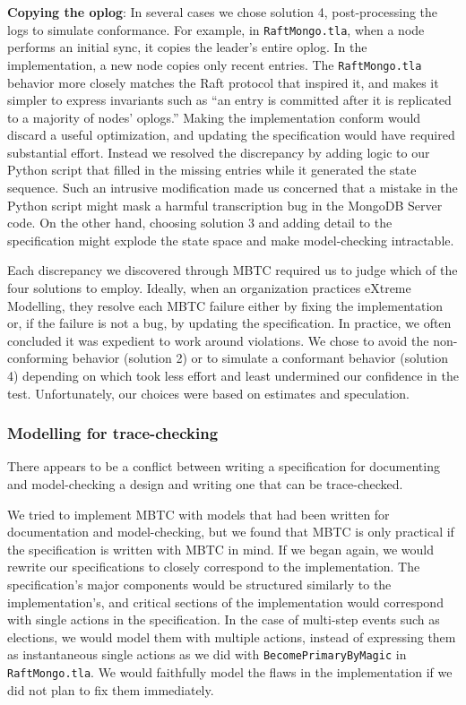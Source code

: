 \documentclass{vldb}
\begin{document}
\textbf{Copying the oplog}: In several cases we chose solution 4, post-processing the logs to simulate conformance. For example, in \texttt{RaftMongo.tla}, when a node performs an initial sync, it copies the leader's entire oplog.
In the implementation, a new node copies only recent entries.
The \texttt{RaftMongo.tla} behavior more closely matches the Raft protocol that inspired it, and makes it simpler to express invariants such as ``an entry is committed after it is replicated to a majority of nodes' oplogs.''
Making the implementation conform would discard a useful optimization, and updating the specification would have required substantial effort.
Instead we resolved the discrepancy by adding logic to our Python script that filled in the missing entries while it generated the state sequence.
Such an intrusive modification made us concerned that a mistake in the Python script might mask a harmful transcription bug in the MongoDB Server code.
On the other hand, choosing solution 3 and adding detail to the specification might explode the state space and make model-checking intractable.

Each discrepancy we discovered through MBTC required us to judge which of the four solutions to employ. 
Ideally, when an organization practices eXtreme Modelling, they resolve each MBTC failure either by fixing the implementation or, if the failure is not a bug, by updating the specification.
In practice, we often concluded it was expedient to work around violations.
We chose to avoid the non-conforming behavior (solution 2) or to simulate a conformant behavior (solution 4) depending on which took less effort and least undermined our confidence in the test.
Unfortunately, our choices were based on estimates and speculation.

\subsubsection{Modelling for trace-checking}
\label{subsubsec:modelling_for_trace_checking}

There appears to be a conflict between writing a specification for documenting and model-checking a design and writing one that can be trace-checked.

We tried to implement MBTC with models that had been written for documentation and model-checking, but we found that MBTC is only practical if the specification is written with MBTC in mind.
If we began again, we would rewrite our specifications to closely correspond to the implementation.
The specification's major components would be structured similarly to the implementation's, and critical sections of the implementation would correspond with single actions in the specification.
In the case of multi-step events such as elections, we would model them with multiple actions, instead of expressing them as instantaneous single actions as we did with \texttt{BecomePrimaryByMagic} in \texttt{RaftMongo.tla}.
We would faithfully model the flaws in the implementation if we did not plan to fix them immediately.
\end{document}
